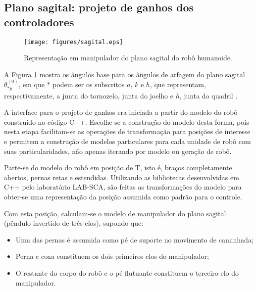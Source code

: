 \subsection{Plano sagital: projeto de ganhos dos controladores} \label{subsec:sagital}

\begin{figure}
\centering
\texttt{[image: figures/sagital.eps]}
\caption{Representação em manipulador do plano sagital do robô humanoide.}
\label{fig:sagital}
\end{figure}

A Figura \ref{fig:sagital} mostra os ângulos base para os ângulos de arfagem do plano sagital $\theta^{(0)}_{*p}$, em que $*$ podem ser os subscritos $a$, $k$ e $h$, que representam, respectivamente, a junta do tornozelo, junta do joelho e $h$, junta do quadril \cite{tesemarcosmestr}. %

A interface para o projeto de ganhos era iniciada a partir do modelo do robô construído no código C++. Escolhe-se a construção do modelo desta forma, pois nesta etapa facilitam-se as operações de transformação para posições de interesse e permitem a construção de modelos particulares para cada unidade de robô com suas particularidades, não apenas iterando por modelo ou geração de robô. 

Parte-se do modelo do robô em posição de T, isto é, braços completamente abertos, pernas retas e estendidas. Utilizando as bibliotecas desenvolvidas em C++ pelo laboratório LAB-SCA, são feitas as transformações do modelo para obter-se uma representação da posição assumida como padrão para o controle. 

Com esta posição, calculam-se o modelo de manipulador do plano sagital (pêndulo invertido de três elos), supondo que:
\begin{itemize}
\item Uma das pernas é assumida como pé de suporte no movimento de caminhada;
\item Perna e coxa constituem os dois primeiros elos do manipulador;
\item O restante do corpo do robô e o pé flutuante constituem o terceiro elo do manipulador.
\end{itemize}

